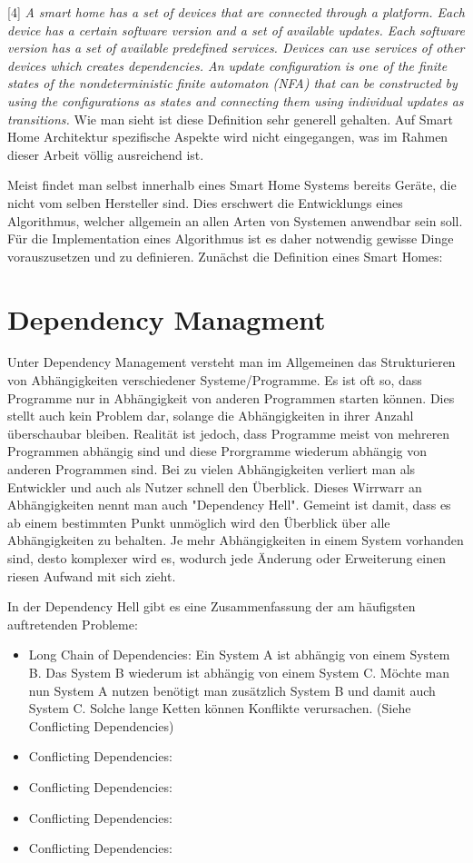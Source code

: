 [4]
\textit{A smart home has a set of devices that are connected through
a platform. Each device has a certain software version and
a set of available updates. Each software version has a set
of available predefined services. Devices can use services of
other devices which creates dependencies. An update configuration
is one of the finite states of the nondeterministic
finite automaton (NFA) that can be constructed by using the
configurations as states and connecting them using individual
updates as transitions.}
Wie man sieht ist diese Definition sehr generell gehalten. Auf Smart Home Architektur spezifische Aspekte wird nicht eingegangen,
was im Rahmen dieser Arbeit völlig ausreichend ist.  




Meist findet man selbst innerhalb eines Smart Home Systems bereits Geräte, die nicht vom selben
Hersteller sind. Dies erschwert die Entwicklungs eines Algorithmus, welcher allgemein an allen Arten von Systemen anwendbar 
sein soll. Für die Implementation eines Algorithmus ist es daher notwendig gewisse Dinge vorauszusetzen und zu definieren.
Zunächst die Definition eines Smart Homes:






\section{Dependency Managment}

Unter Dependency Management versteht man im Allgemeinen das Strukturieren von Abhängigkeiten verschiedener 
Systeme/Programme. Es ist oft so, dass Programme nur in Abhängigkeit von anderen Programmen starten können.
Dies stellt auch kein Problem dar, solange die Abhängigkeiten in ihrer Anzahl überschaubar bleiben. 
Realität ist jedoch, dass Programme meist von mehreren Programmen abhängig sind und diese
Prorgramme wiederum abhängig von anderen Programmen sind. Bei zu vielen Abhängigkeiten verliert man 
als Entwickler und auch als Nutzer schnell den Überblick. Dieses Wirrwarr an Abhängigkeiten nennt man auch "Dependency Hell".
Gemeint ist damit, dass es ab einem bestimmten Punkt unmöglich wird den Überblick über alle Abhängigkeiten zu behalten.
Je mehr Abhängigkeiten in einem System vorhanden sind, desto komplexer wird es, wodurch jede Änderung oder 
Erweiterung einen riesen Aufwand mit sich zieht. 

In der Dependency Hell gibt es eine Zusammenfassung der am häufigsten auftretenden Probleme:
\begin{itemize}
 \item Long Chain of Dependencies: Ein System A ist abhängig von einem System B. Das System B wiederum ist abhängig von einem System C.
Möchte man nun System A nutzen benötigt man zusätzlich System B und damit auch System C. Solche lange Ketten können Konflikte verursachen.
(Siehe Conflicting Dependencies)
\item Conflicting Dependencies: 
\item Conflicting Dependencies: 
\item Conflicting Dependencies: 
\item Conflicting Dependencies: 
\end{itemize}

